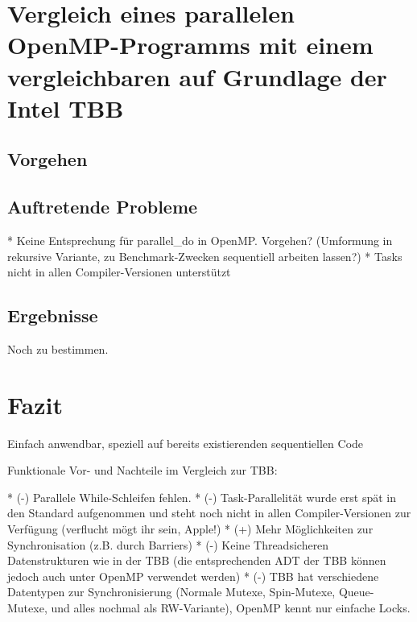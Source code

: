 \documentclass[11pt]{scrartcl}
\begin{document}
\pagebreak %



\section{Vergleich eines parallelen OpenMP-Programms mit einem vergleichbaren auf Grundlage der Intel TBB}

\subsection{Vorgehen}

\subsection{Auftretende Probleme}

  * Keine Entsprechung für parallel\_do in OpenMP. Vorgehen? (Umformung in rekursive Variante, zu Benchmark-Zwecken sequentiell arbeiten lassen?)
  * Tasks nicht in allen Compiler-Versionen unterstützt

\subsection{Ergebnisse}

Noch zu bestimmen.

\section{Fazit}

Einfach anwendbar, speziell auf bereits existierenden sequentiellen Code

Funktionale Vor- und Nachteile im Vergleich zur TBB:

  * (-) Parallele While-Schleifen fehlen.
  * (-) Task-Parallelität wurde erst spät in den Standard aufgenommen und steht noch nicht in allen Compiler-Versionen zur Verfügung (verflucht mögt ihr sein, Apple!)
  * (+) Mehr Möglichkeiten zur Synchronisation (z.B. durch Barriers)
  * (-) Keine Threadsicheren Datenstrukturen wie in der TBB (die entsprechenden ADT der TBB können jedoch auch unter OpenMP verwendet werden)
  * (-) TBB hat verschiedene Datentypen zur Synchronisierung (Normale Mutexe, Spin-Mutexe, Queue-Mutexe, und alles nochmal als RW-Variante), OpenMP kennt nur einfache Locks.
\end{document}
